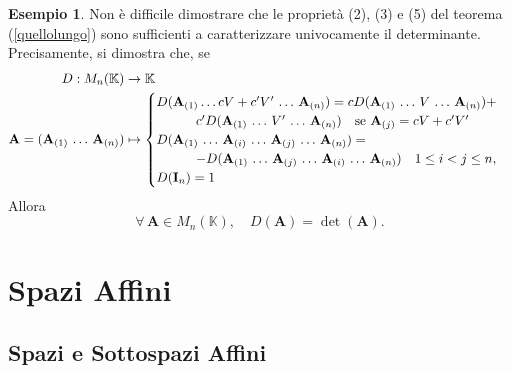 \documentclass{article}
\theoremstyle{plain}
\theoremstyle{definition}
\newtheorem{exmp}{Esempio}[section]
\theoremstyle{remark}
\begin{document}
\vspace{10pt}

\begin{exmp}
    Non è difficile dimostrare che le proprietà (2), (3) e (5) del teorema (\ref{quellolungo}) sono sufficienti a caratterizzare univocamente il determinante. Precisamente, si dimostra che, se 
    \begin{align*}
        D:M_n(\mathbb{K})&\to\mathbb{K}\\
        \mathbf{A}=(\mathbf{A}_{(1)}\,\ldots\,\mathbf{A}_{(n)})&\mapsto\begin{cases}
            D(\mathbf{A}_{(1)}\ldots cV+c'V'\,\ldots\,\mathbf{A}_{(n)})=cD(\mathbf{A}_{(1)}\,\ldots\,V\,\ldots\,\mathbf{A}_{(n)})+\\
            \quad\quad\quad c'D(\mathbf{A}_{(1)}\,\ldots\,V'\,\ldots\,\mathbf{A}_{(n)})\quad \textup{se }\mathbf{A}_{(j)}=cV+c'V'\\
            D(\mathbf{A}_{(1)}\,\ldots\,\mathbf{A}_{(i)}\,\ldots\,\mathbf{A}_{(j)}\,\ldots\,\mathbf{A}_{(n)})=\\
            \quad\quad\quad -D(\mathbf{A}_{(1)}\,\ldots\,\mathbf{A}_{(j)}\,\ldots\,\mathbf{A}_{(i)}\,\ldots\,\mathbf{A}_{(n)})\quad 1\leq i<j\leq n,\\
            D(\mathbf{I}_n)=1\\         
        \end{cases}
    \end{align*}
    Allora \[\forall\,\mathbf{A}\in M_n(\mathbb{K}),\quad D(\mathbf{A})=\det(\mathbf{A}).\]
\end{exmp}

\newpage
\section{Spazi Affini}
\vspace{20pt}

\vspace{20pt}
\subsection{Spazi e Sottospazi Affini}
\vspace{20pt}
\end{document}
